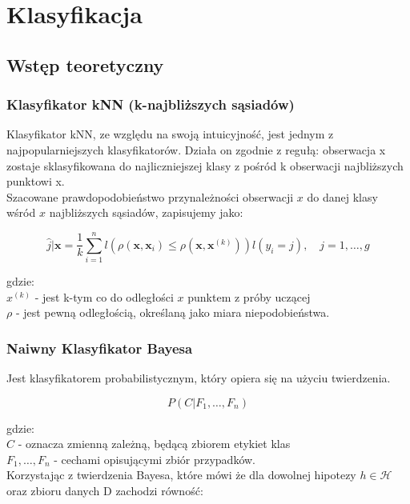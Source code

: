 \section{Klasyfikacja}
\subsection{Wstęp teoretyczny}
\subsubsection{Klasyfikator kNN (k-najbliższych sąsiadów) \cite{wyklad}}
Klasyfikator kNN, ze względu na swoją intuicyjność, jest jednym z najpopularniejszych klasyfikatorów. Działa on zgodnie z regułą: obserwacja x zostaje sklasyfikowana do najliczniejszej klasy z pośród k obserwacji najbliższych punktowi x.\\

Szacowane prawdopodobieństwo przynależności obserwacji ${x}$ do danej klasy wśród ${x}$ najbliższych sąsiadów, zapisujemy jako:

\begin{equation}
    \hat{j}|\mathbf{x} = \frac{1}{k} \sum_{i=1}^{n} l\left( \rho(\mathbf{x}, \mathbf{x}_i) \leq \rho(\mathbf{x}, \mathbf{x}^{(k)}) \right) l(y_i = j), \quad j = 1, \ldots, g
\end{equation}

gdzie:\\
${x}^{(k)}$ - jest k-tym co do odległości ${x}$ punktem z próby uczącej\\
$\rho$ - jest pewną odległością, określaną jako miara niepodobieństwa.

\subsubsection{Naiwny Klasyfikator Bayesa \cite{wyklad}}
Jest klasyfikatorem probabilistycznym, który opiera się na użyciu twierdzenia.

\begin{equation}
P(C|F_1, \ldots, F_n)
\end{equation}

gdzie:\\
$C$ - oznacza zmienną zależną, będącą zbiorem etykiet klas\\
 $F_1, \ldots, F_n$ - cechami opisującymi zbiór przypadków.\\

 Korzystając z twierdzenia Bayesa, które mówi że dla dowolnej hipotezy $h \in \mathcal{H}$ oraz zbioru danych D zachodzi równość:

